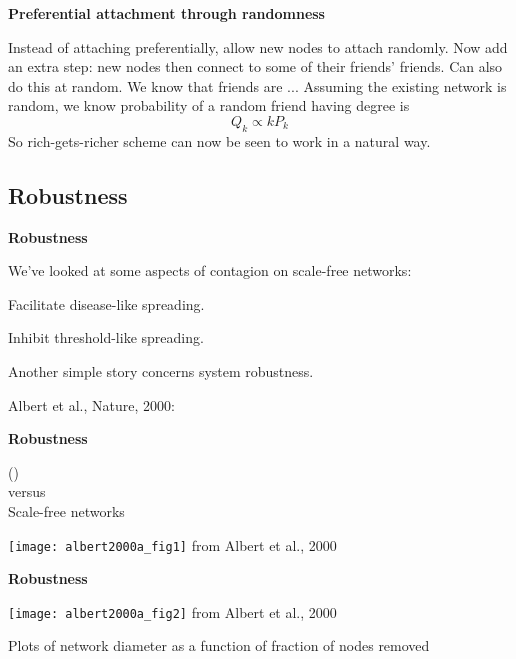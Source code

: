 \begin{frame}[label=]
\begin{frame}[label=]
\begin{frame}[label=]
\begin{frame}[label=]
\begin{frame}[label=]
\begin{frame}[label=]
\begin{frame}[label=]
\begin{frame}[label=]
\begin{frame}[label=]
\begin{frame}[label=]
\begin{frame}[label=]
\begin{frame}[label=]
\begin{frame}[label=]
\begin{frame}[label=]
\begin{frame}[label=]
\begin{frame}[label=]
\begin{frame}[label=]
 \textbf{Preferential attachment through randomness}  

 
  Instead of attaching preferentially, allow
   new nodes to attach randomly.
  Now add an \alert{extra step}: new nodes
   then connect to some of their friends' friends.
  Can also do this \alert{at random}.
  We know that friends are ...
  Assuming the existing network is random,
   we know probability of a \alert{random friend} having
   degree  is 
   $$Q_k \propto kP_k$$
  So \alert{rich-gets-richer} scheme can
   now be seen to work in a natural way.
 


\subsection{Robustness}

\begin{frame}[label=]
 \textbf{Robustness}  

 
 
   We've looked at some aspects of 
   contagion on scale-free networks:
   
    
     Facilitate disease-like spreading.
    
     Inhibit threshold-like spreading.
   
 
   Another simple story concerns \alert{system robustness}.
 
   Albert et al., Nature, 2000:\\
   \cite{albert2000a}
 



\begin{frame}[label=]
 \textbf{Robustness}  

 
   (\erdosrenyi)\\
   versus\\
   \alert{Scale-free networks}
 

 \texttt{[image: albert2000a\_fig1]}
 {\tiny from Albert et al., 2000}


\begin{frame}[label=]
 \textbf{Robustness}  

    
   \texttt{[image: albert2000a\_fig2]}
   {\tiny from Albert et al., 2000}
   
   
    
     Plots of network diameter as a function of fraction of nodes removed
    

\end{frame}
\end{frame}
\end{frame}
\end{frame}
\end{frame}
\end{frame}
\end{frame}
\end{frame}
\end{frame}
\end{frame}
\end{frame}
\end{frame}
\end{frame}
\end{frame}
\end{frame}
\end{frame}
\end{frame}
\end{frame}
\end{frame}
\end{frame}
